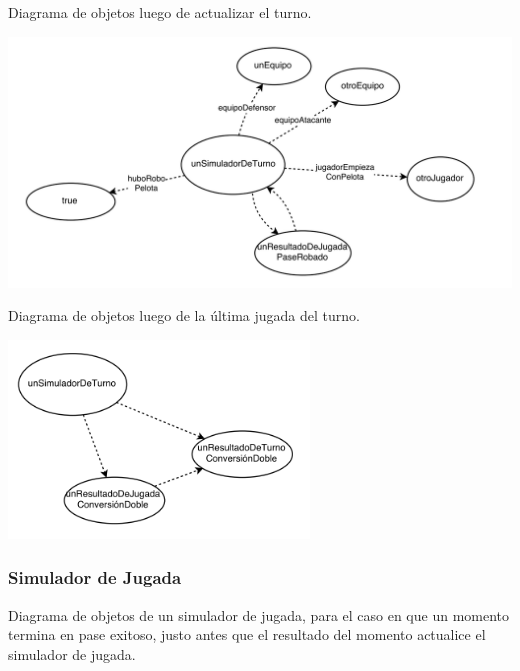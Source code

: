Diagrama de objetos luego de actualizar el turno.

\begin{center}
\includegraphics[width=15cm]{diagramas/DO4}
\end{center}

Diagrama de objetos luego de la \'ultima jugada del turno.

\begin{center}
\includegraphics[width=8cm]{diagramas/DO5}
\end{center}

\subsubsection{Simulador de Jugada}

Diagrama de objetos de un simulador de jugada, para el caso en que un momento termina en pase exitoso, justo antes que el resultado del momento
actualice el simulador de jugada.

